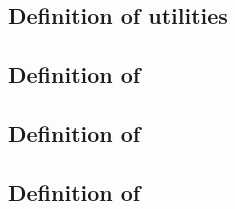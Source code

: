 \subsection{Definition of \wcpMod{} utilities                      }    \label{bls: utilities: wcp calls}                        %
\subsection{Definition of \callToWellFormedCoordinatesBlsName{}    }    \label{bls: utilities: well formed fp coordinates}       %
\subsection{Definition of \callToWellFormedCoordinatesBlsTwoName{} }    \label{bls: utilities: well formed fp2 coordinates}      %
\subsection{Definition of \callToIsInfinityName{}                  }    \label{bls: utilities: call to is infinity}              %
